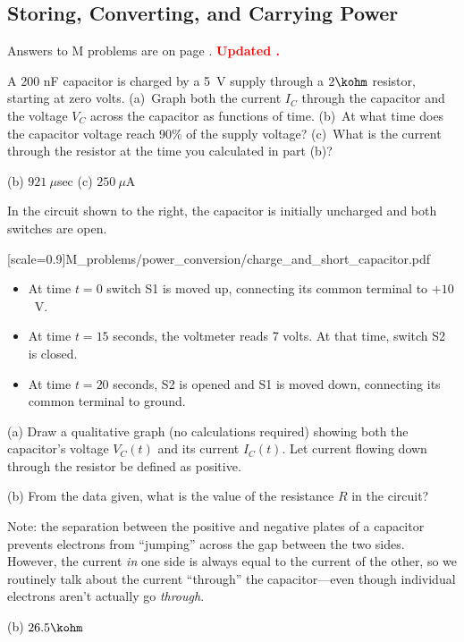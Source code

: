 \subsection{Storing, Converting, and Carrying Power} 

Answers to M problems are on page \pageref{power_conversion_prob_answers}.  \textbf{\textcolor{red}{Updated \DTMnow.}}

\begin{Exercise}
A 200 nF capacitor is charged by a 5~V supply through a $2\kohm$ resistor, starting at zero volts.  (a)~Graph both the current $I_C$ through the capacitor and the voltage $V_C$ across the capacitor as functions of time.  (b)~At what time does the capacitor voltage reach 90\% of the supply voltage?  (c)~What is the current through the resistor at the time you calculated in part (b)?
\end{Exercise}
\begin{Answer}
(b) $921~\mu$sec (c) $250~\mu$A
\end{Answer}


\begin{Exercise}
In the circuit shown to the right, the capacitor is initially uncharged and both switches are open. 
 
[scale=0.9]{M_problems/power_conversion/charge_and_short_capacitor.pdf} {
\begin{itemize}[nosep]
	\item At time $t=0$  switch S1 is moved up, connecting its common terminal to $+10$~V. 
	\item At time $t=15$ seconds, the voltmeter reads 7 volts.  At that time, switch S2 is closed. 
	\item At time $t=20$ seconds, S2 is opened and S1 is moved down, connecting its common terminal to ground.
	\end{itemize}
	\medskip
	(a) Draw a qualitative graph (no calculations required) showing both the capacitor's voltage $V_C(t)$ and its current $I_C(t)$. %
	Let current flowing down through the resistor be defined as positive.
	\medskip
	
	(b) From the data given, what is the value of the resistance $R$ in the circuit?
	}
Note: the separation between the positive and negative plates of a capacitor prevents electrons from ``jumping'' across the gap between the two sides.  However, the current \textit{in} one side is always equal to the current  of the other, so we routinely talk about the current ``through'' the capacitor---even though individual electrons aren't actually go \textit{through}.
\end{Exercise}
\begin{Answer}
(b) $26.5\kohm$
\end{Answer}


